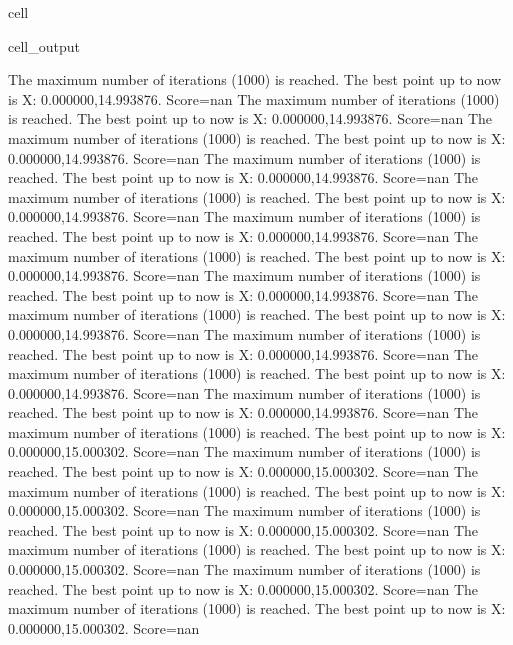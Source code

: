 \documentclass[letterpaper,10pt,english]{jupyterBook}
\begin{document}
\begin{sphinxuseclass}{cell}
\begin{sphinxVerbatimOutput}
\begin{sphinxuseclass}{cell_output}
\begin{sphinxVerbatim}[commandchars=\\\{\}]
The maximum number of iterations (1000) is reached. The best point up to now is X: \PYGZob{}0.000000,14.993876\PYGZcb{}. Score=\PYGZhy{}nan
The maximum number of iterations (1000) is reached. The best point up to now is X: \PYGZob{}0.000000,14.993876\PYGZcb{}. Score=\PYGZhy{}nan
The maximum number of iterations (1000) is reached. The best point up to now is X: \PYGZob{}0.000000,14.993876\PYGZcb{}. Score=\PYGZhy{}nan
The maximum number of iterations (1000) is reached. The best point up to now is X: \PYGZob{}0.000000,14.993876\PYGZcb{}. Score=\PYGZhy{}nan
The maximum number of iterations (1000) is reached. The best point up to now is X: \PYGZob{}0.000000,14.993876\PYGZcb{}. Score=\PYGZhy{}nan
The maximum number of iterations (1000) is reached. The best point up to now is X: \PYGZob{}0.000000,14.993876\PYGZcb{}. Score=\PYGZhy{}nan
The maximum number of iterations (1000) is reached. The best point up to now is X: \PYGZob{}0.000000,14.993876\PYGZcb{}. Score=\PYGZhy{}nan
The maximum number of iterations (1000) is reached. The best point up to now is X: \PYGZob{}0.000000,14.993876\PYGZcb{}. Score=\PYGZhy{}nan
The maximum number of iterations (1000) is reached. The best point up to now is X: \PYGZob{}0.000000,14.993876\PYGZcb{}. Score=\PYGZhy{}nan
The maximum number of iterations (1000) is reached. The best point up to now is X: \PYGZob{}0.000000,14.993876\PYGZcb{}. Score=\PYGZhy{}nan
The maximum number of iterations (1000) is reached. The best point up to now is X: \PYGZob{}0.000000,14.993876\PYGZcb{}. Score=\PYGZhy{}nan
The maximum number of iterations (1000) is reached. The best point up to now is X: \PYGZob{}0.000000,14.993876\PYGZcb{}. Score=\PYGZhy{}nan
The maximum number of iterations (1000) is reached. The best point up to now is X: \PYGZob{}0.000000,15.000302\PYGZcb{}. Score=\PYGZhy{}nan
The maximum number of iterations (1000) is reached. The best point up to now is X: \PYGZob{}0.000000,15.000302\PYGZcb{}. Score=\PYGZhy{}nan
The maximum number of iterations (1000) is reached. The best point up to now is X: \PYGZob{}0.000000,15.000302\PYGZcb{}. Score=\PYGZhy{}nan
The maximum number of iterations (1000) is reached. The best point up to now is X: \PYGZob{}0.000000,15.000302\PYGZcb{}. Score=\PYGZhy{}nan
The maximum number of iterations (1000) is reached. The best point up to now is X: \PYGZob{}0.000000,15.000302\PYGZcb{}. Score=\PYGZhy{}nan
The maximum number of iterations (1000) is reached. The best point up to now is X: \PYGZob{}0.000000,15.000302\PYGZcb{}. Score=\PYGZhy{}nan
The maximum number of iterations (1000) is reached. The best point up to now is X: \PYGZob{}0.000000,15.000302\PYGZcb{}. Score=\PYGZhy{}nan

\end{sphinxVerbatim}
\end{sphinxuseclass}
\end{sphinxVerbatimOutput}
\end{sphinxuseclass}
\end{document}
